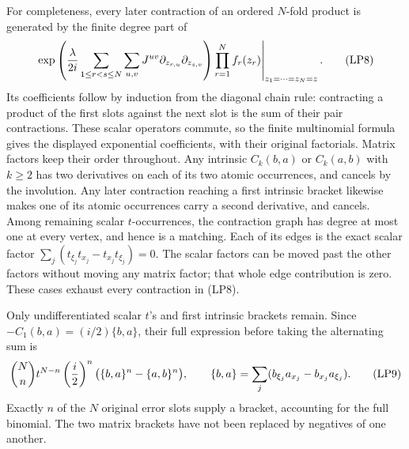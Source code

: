 \documentclass[
  11pt,
]{article}
\begin{document}
For completeness, every later contraction of an ordered \(N\)-fold
product is generated by the finite degree part of \[
 \left.\exp\left({\lambda\over2i}
       \sum_{1\le r<s\le N}\sum_{u,v}J^{uv}
                \partial_{z_{r,u}}\partial_{z_{s,v}}\right)
               \prod_{r=1}^N f_r(z_r)\right|_{z_1=\cdots=z_N=z}.
 \tag{LP8}
\] Its coefficients follow by induction from the diagonal chain rule:
contracting a product of the first slots against the next slot is the
sum of their pair contractions. These scalar operators commute, so the
finite multinomial formula gives the displayed exponential coefficients,
with their original factorials. Matrix factors keep their order
throughout. Any intrinsic \(C_k(b,a)\) or \(C_k(a,b)\) with \(k\ge2\)
has two derivatives on each of its two atomic occurrences, and cancels
by the involution. Any later contraction reaching a first intrinsic
bracket likewise makes one of its atomic occurrences carry a second
derivative, and cancels. Among remaining scalar \(t\)-occurrences, the
contraction graph has degree at most one at every vertex, and hence is a
matching. Each of its edges is the exact scalar factor
\(\sum_j(t_{\xi_j}t_{x_j}-t_{x_j}t_{\xi_j})=0\). The scalar factors can
be moved past the other factors without moving any matrix factor; that
whole edge contribution is zero. These cases exhaust every contraction
in (LP8).

Only undifferentiated scalar \(t\)'s and first intrinsic brackets
remain. Since \(-C_1(b,a)=(i/2)\{b,a\}\), their full expression before
taking the alternating sum is \[
 \binom Nn t^{N-n}\left({i\over2}\right)^n
            \bigl(\{b,a\}^n-\{a,b\}^n\bigr),
 \qquad
 \{b,a\}=\sum_j(b_{\xi_j}a_{x_j}-b_{x_j}a_{\xi_j}).
 \tag{LP9}
\] Exactly \(n\) of the \(N\) original error slots supply a bracket,
accounting for the full binomial. The two matrix brackets have not been
replaced by negatives of one another.
\end{document}
